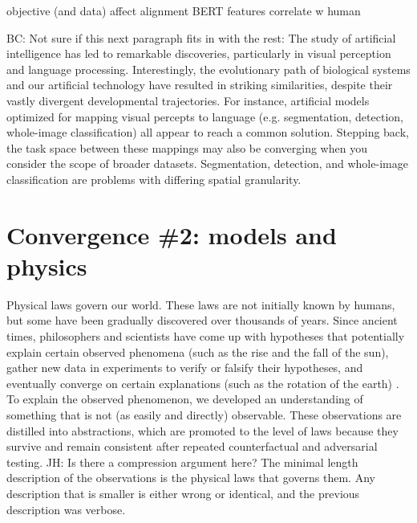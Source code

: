 \documentclass{article}
\newcommand{\jh}[1]{{\;\color{red}JH: #1}}
\newcommand{\bc}[1]{{\color{olive}BC: #1}}
\theoremstyle{plain}
\theoremstyle{definition}
\theoremstyle{remark}
\begin{document}
objective (and data) affect alignment \citep{muttenthaler2022human}
BERT features correlate w human \citep{zhang2019bertscore}

\bc{Not sure if this next paragraph fits in with the rest:}
The study of artificial intelligence has led to remarkable discoveries, particularly in visual perception and language processing. Interestingly, the evolutionary path of biological systems and our artificial technology have resulted in striking similarities, despite their vastly divergent developmental trajectories. For instance, artificial models optimized for mapping visual percepts to language (e.g. segmentation, detection, whole-image classification) all appear to reach a common solution. Stepping back, the task space between these mappings may also be converging when you consider the scope of broader datasets. Segmentation, detection, and whole-image classification are problems with differing spatial granularity.

\section{Convergence \#2: models and physics}


Physical laws govern our world. These laws are not initially known by humans, but some have been gradually discovered over thousands of years. Since ancient times, philosophers and scientists have come up with hypotheses that potentially explain certain observed phenomena (such as the rise and the fall of the sun), gather new data in experiments to verify or falsify their hypotheses, and eventually converge on certain explanations (such as the rotation of the earth) \citep{newton1989truth}. To explain the observed phenomenon, we developed an understanding of something that is not (as easily and directly) observable. These observations are distilled into abstractions, which are promoted to the level of laws because they survive and remain consistent after repeated counterfactual and adversarial testing.
\jh{Is there a compression argument here? The minimal length description of the observations is the physical laws that governs them. Any description that is smaller is either wrong or identical, and the previous description was verbose.}
\end{document}
